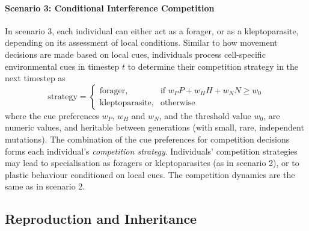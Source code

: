 \paragraph{Scenario 3: Conditional Interference Competition}

In scenario 3, each individual can either act as a forager, or as a kleptoparasite, depending on its assessment of local conditions.
Similar to how movement decisions are made based on local cues, individuals process cell-specific environmental cues in timestep $t$ to determine their competition strategy in the next timestep as
\begin{equation}
    \text{strategy} = 
\begin{cases}
    \text{forager},& \text{if } w_PP + w_HH + w_NN \geq w_0\\
    \text{kleptoparasite},              & \text{otherwise}
\end{cases}
\end{equation}  
where the cue preferences $w_P$, $w_H$ and $w_N$, and the threshold value $w_0$, are numeric values, and heritable between generations (with small, rare, independent mutations).
The combination of the cue preferences for competition decisions forms each individual's \textit{competition strategy}.
Individuals' competition strategies may lead to specialisation as foragers or kleptoparasites (as in scenario 2), or to plastic behaviour conditioned on local cues.
The competition dynamics are the same as in scenario 2.

\subsection*{Reproduction and Inheritance}

